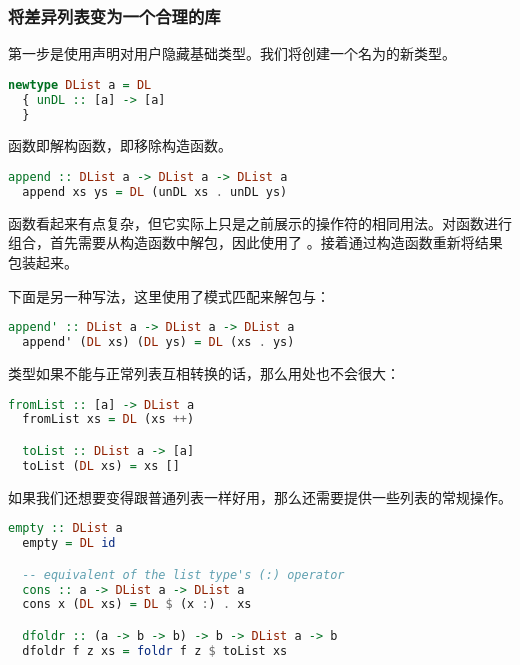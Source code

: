 \documentclass[./main.tex]{subfiles}
\begin{document}
\subsubsection*{将差异列表变为一个合理的库}

第一步是使用声明对用户隐藏基础类型。我们将创建一个名为的新类型。

\begin{lstlisting}[language=Haskell]
  newtype DList a = DL
  { unDL :: [a] -> [a]
  }
\end{lstlisting}

函数即解构函数，即移除构造函数。

\begin{lstlisting}[language=Haskell]
  append :: DList a -> DList a -> DList a
  append xs ys = DL (unDL xs . unDL ys)
\end{lstlisting}

函数看起来有点复杂，但它实际上只是之前展示的操作符的相同用法。对函数进行组合，首先需要从构造函数中解包，因此使用了
。接着通过构造函数重新将结果包装起来。

下面是另一种写法，这里使用了模式匹配来解包与：

\begin{lstlisting}[language=Haskell]
  append' :: DList a -> DList a -> DList a
  append' (DL xs) (DL ys) = DL (xs . ys)
\end{lstlisting}

类型如果不能与正常列表互相转换的话，那么用处也不会很大：

\begin{lstlisting}[language=Haskell]
  fromList :: [a] -> DList a
  fromList xs = DL (xs ++)

  toList :: DList a -> [a]
  toList (DL xs) = xs []
\end{lstlisting}

如果我们还想要变得跟普通列表一样好用，那么还需要提供一些列表的常规操作。

\begin{lstlisting}[language=Haskell]
  empty :: DList a
  empty = DL id

  -- equivalent of the list type's (:) operator
  cons :: a -> DList a -> DList a
  cons x (DL xs) = DL $ (x :) . xs

  dfoldr :: (a -> b -> b) -> b -> DList a -> b
  dfoldr f z xs = foldr f z $ toList xs
\end{lstlisting}
\end{document}
